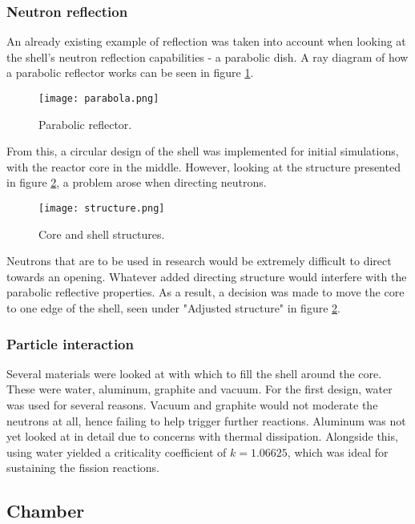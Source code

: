 \subsubsection{Neutron reflection}

An already existing example of reflection was taken into account when looking at the shell's neutron reflection capabilities - a parabolic dish. A ray diagram of how a parabolic reflector works can be seen in figure \ref{fig:parabola}.

\begin{figure}[!htbp]
\caption{Parabolic reflector.}
\label{fig:parabola}
\centering
\texttt{[image: parabola.png]}
\end{figure}

From this, a circular design of the shell was implemented for initial simulations, with the reactor core in the middle. However, looking at the structure presented in figure \ref{fig:structure}, a problem arose when directing neutrons.

\begin{figure}[!htbp]
\caption{Core and shell structures.}
\label{fig:structure}
\centering
\texttt{[image: structure.png]}
\end{figure}

Neutrons that are to be used in research would be extremely difficult to direct towards an opening. Whatever added directing structure  would interfere with the parabolic reflective properties. As a result, a decision was made to move the core to one edge of the shell, seen under "Adjusted structure" in figure \ref{fig:structure}.

\subsubsection{Particle interaction}

Several materials were looked at with which to fill the shell around the core. These were water, aluminum, graphite and vacuum. For the first design, water was used for several reasons. Vacuum and graphite would not moderate the neutrons at all, hence failing to help trigger further reactions. Aluminum was not yet looked at in detail due to concerns with thermal dissipation. Alongside this, using water yielded a criticality coefficient of $k=1.06625$, which was ideal for sustaining the fission reactions.

\subsection{Chamber}

